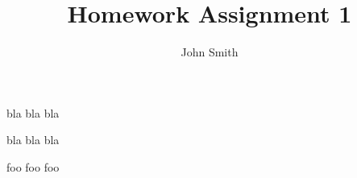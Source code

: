 \documentclass[12pt,runningheads]{article}
\begin{document}

\title{Homework Assignment 1}
\author{John Smith}
\maketitle

bla bla bla

\newpage

bla bla bla

\newpage

foo foo foo
\end{document}
